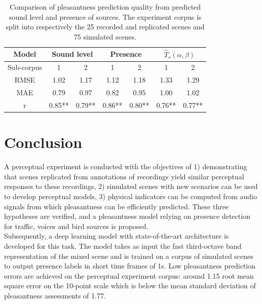 \documentclass[11pt,a4paper]{article}
\begin{document}
\begin{table}[t]
\centering
\caption{Comparison of pleasantness prediction quality from predicted sound level and presence of sources. The experiment corpus is split into respectively the 25 recorded and replicated scenes and 75 simulated scenes.}
\label{tab:pppred}
\begin{tabular}{ c | c c | c c | c c }
\hline
	Model & \multicolumn{2}{|c}{Sound level} & \multicolumn{2}{|c}{Presence} & \multicolumn{2}{|c}{$\hat T_s(\alpha, \beta)$} \\ \hline
	Sub-corpus & 1 & 2 & 1 & 2 & 1 & 2 \\ \hline
	RMSE & 1.02 & 1.17 & 1.12 & 1.18 & 1.33 & 1.29 \\
	MAE & 0.79 & 0.97 & 0.82 & 0.95 & 1.00 & 1.02 \\ \hline
	r & 0.85** & 0.79** & 0.86** & 0.80** & 0.76** & 0.77** \\ \hline
\end{tabular}
\end{table}




\section{Conclusion}
\label{sec:ccl}

A perceptual experiment is conducted with the objectives of 1) demonstrating that scenes replicated from annotations of recordings yield similar perceptual responses to these recordings, 2) simulated scenes with new scenarios can be used to develop perceptual models, 3) physical indicators can be computed from audio signals from which pleasantness can be efficiently predicted. These three hypotheses are verified, and a pleasantness model relying on presence detection for traffic, voices and bird sources is proposed.\\

Subsequently, a deep learning model with state-of-the-art architecture is developed for this task. The model takes as input the fast third-octave band representation of the mixed scene and is trained on a corpus of simulated scenes to output presence labels in short time frames of 1s. Low pleasantness prediction errors are achieved on the perceptual experiment corpus: around 1.15 root mean square error on the 10-point scale which is below the mean standard deviation of pleasantness assessments of 1.77.\\
\end{document}
